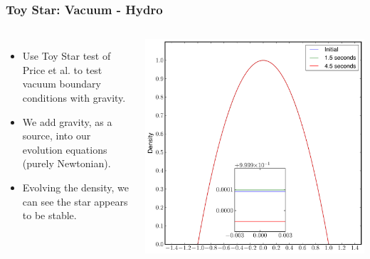 \documentclass{beamer}
\begin{document}
\begin{frame}
\frametitle{Toy Star: Vacuum - Hydro}
\begin{columns}
\begin{itemize}
\item{Use Toy Star test of Price et al. to test vacuum boundary conditions with gravity.}
\item{We add gravity, as a source, into our evolution equations (purely Newtonian).}
\item{Evolving the density, we can see the star appears to be stable.}
\end{itemize}
\centering
\includegraphics[width=\textwidth]{../images/toy_density}
\end{columns}
\end{frame}

\end{document}
